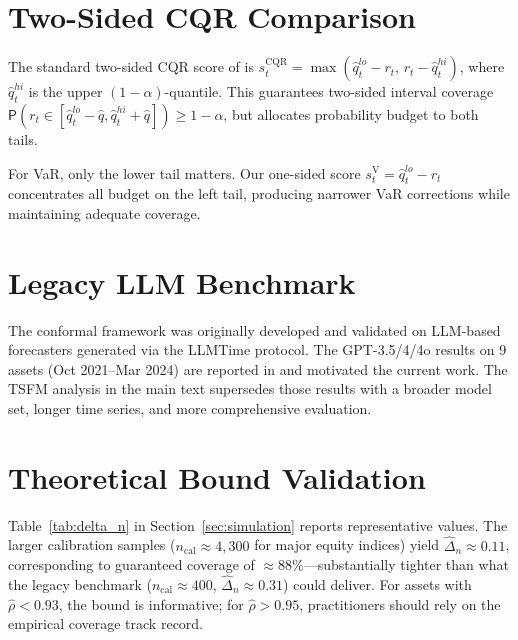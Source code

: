 \documentclass[preprint,11pt,authoryear]{elsarticle}
\renewcommand{\P}{\mathsf{P}}
\newcommand{\1}{\boldsymbol{1}}
\begin{document}
	\section{Two-Sided CQR Comparison}
	\label{app:twosided}
	
	The standard two-sided CQR score of \citet{romano2019conformalized}
	is $s_t^{\mathrm{CQR}} = \max(\hat{q}_t^{lo}-r_t,\,
	r_t-\hat{q}_t^{hi})$, where $\hat{q}_t^{hi}$ is the upper
	$(1-\alpha)$-quantile. This guarantees two-sided interval coverage
	$\P(r_t \in [\hat{q}_t^{lo} - \hat{q}, \hat{q}_t^{hi} + \hat{q}])
	\geq 1-\alpha$, but allocates probability budget to both tails.
	
	For VaR, only the lower tail matters. Our one-sided score
	$s_t^{\mathrm{V}} = \hat{q}_t^{lo} - r_t$ concentrates all budget
	on the left tail, producing narrower VaR corrections while maintaining adequate coverage.
	
	
	\section{Legacy LLM Benchmark}
	\label{app:legacy}
	
	The conformal framework was originally developed and validated 
	on LLM-based forecasters generated via the LLMTime protocol. The GPT-3.5/4/4o results on 9 assets (Oct 2021--Mar 2024) are  reported in \citet{pele2025llmvar} and motivated the current  work. The TSFM analysis in the main text supersedes those  results with a broader model set, longer time series, and  more comprehensive evaluation.
	
	\section{Theoretical Bound Validation}
	\label{app:delta_n}
	
	Table~\ref{tab:delta_n} in Section~\ref{sec:simulation} reports representative values. The larger calibration samples ($n_{\mathrm{cal}} \approx 4{,}300$ for major equity indices) yield $\hat\Delta_n \approx 0.11$, corresponding to guaranteed coverage of $\approx$88\%---substantially tighter than what the legacy benchmark ($n_{\mathrm{cal}} \approx 400$, $\hat\Delta_n \approx 0.31$) could deliver. For assets with $\hat\rho < 0.93$, the bound is informative; for $\hat\rho > 0.95$, practitioners should rely on the empirical coverage track record.
	
\end{document}
